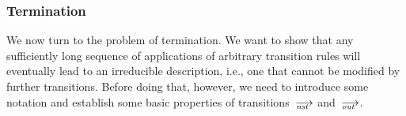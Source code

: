 


\subsubsection{Termination}

We now turn to the problem of termination.  We want to show that any
sufficiently long sequence of applications of arbitrary transition rules
will eventually lead to an irreducible description, i.e., one that cannot be
modified by further transitions.  Before doing that, however, we need to
introduce some notation and establish some basic properties of
transitions~$\nst$ and~$\out$.

